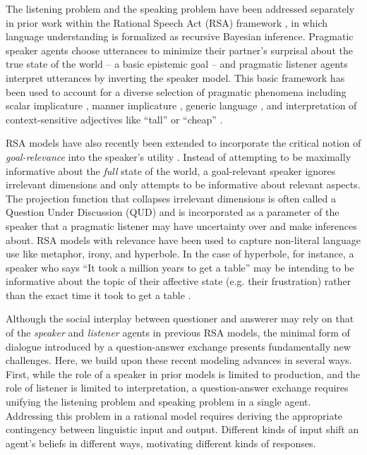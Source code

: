 \documentclass[11pt, floatsintext]{apa6}
\begin{document}
The listening problem and the speaking problem have been addressed separately in prior work within the Rational Speech Act (RSA) framework \cite{FrankGoodman12_PragmaticReasoningLanguageGames, GoodmanStuhlmuller13_KnowledgeImplicature, GoodmanFrank16_RSATiCS}, in which language understanding is formalized as recursive Bayesian inference. 
Pragmatic speaker agents choose utterances to minimize their partner's surprisal about the true state of the world -- a basic epistemic goal -- and pragmatic listener agents interpret utterances by inverting the speaker model. 
This basic framework has been used to account for a diverse selection of pragmatic phenomena including 
scalar implicature \cite{GoodmanStuhlmuller13_KnowledgeImplicature}, 
manner implicature \cite{BergenLevyGoodman16_LexicalUncertainty},
generic language \cite{TesslerGoodman16_Generics}, and
interpretation of context-sensitive adjectives like ``tall'' or ``cheap'' \cite{LassiterGoodman15_AdjectivalVagueness}.

RSA models have also recently been extended to incorporate the critical notion of \emph{goal-relevance} into the speaker's utility \cite{Roberts96_InformationStructureDiscourse, WilsonSperber12_MeaningRelevance}. 
Instead of attempting to be maximally informative about the \emph{full} state of the world, a goal-relevant speaker ignores irrelevant dimensions and only attempts to be informative about relevant aspects. 
The projection function that collapses irrelevant dimensions is often called a Question Under Discussion (QUD) and is incorporated as a parameter of the speaker that a pragmatic listener may have uncertainty over and make inferences about.
RSA models with relevance have been used to capture non-literal language use like metaphor, irony, and hyperbole. 
In the case of hyperbole, for instance, a speaker who says ``It took a million years to get a table'' may be intending to be informative about the topic of their affective state (e.g. their frustration) rather than the exact time it took to get a table \cite{KaoWuBergenGoodman14_NonliteralNumberWords}.

Although the social interplay between questioner and answerer may rely on that of the \emph{speaker} and \emph{listener} agents in previous RSA models, the minimal form of dialogue introduced by a question-answer exchange presents fundamentally new challenges.
Here, we build upon these recent modeling advances in several ways. 
First, while the role of a speaker in prior models is limited to production, and the role of listener is limited to interpretation, a question-answer exchange requires unifying the listening problem and speaking problem in a single agent. 
Addressing this problem in a rational model requires deriving the appropriate contingency between linguistic input and output.
Different kinds of input shift an agent's beliefs in different ways, motivating different kinds of responses. 
\end{document}
